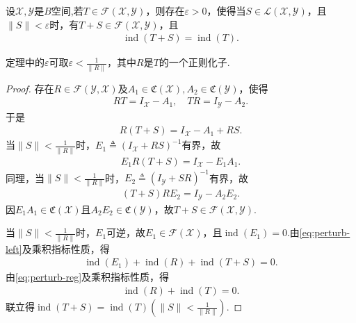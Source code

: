\documentclass[../../main.tex]{subfiles}%
\begin{document}
\begin{theorem}\label{theorem:泛函分析--定理3.6.7}
设$\mathscr{X},\mathscr{Y}$是$B$空间,若$T\in\mathscr{F}(\mathscr{X},\mathscr{Y})$，则存在$\varepsilon>0$，使得当$S\in\mathscr{L}(\mathscr{X},\mathscr{Y})$，且$\|S\|<\varepsilon$时，有$T+S\in\mathscr{F}(\mathscr{X},\mathscr{Y})$，且
\begin{align*}
\operatorname{ind}(T+S)=\operatorname{ind}(T).
\end{align*}
\end{theorem}
\begin{remark}
定理中的$\varepsilon$可取$\varepsilon<\frac{1}{\|R\|}$，其中$R$是$T$的一个正则化子.
\end{remark}
\begin{proof}
存在$R\in\mathscr{F}(\mathscr{Y},\mathscr{X})$及$A_1\in\mathfrak{C}(\mathscr{X}),A_2\in\mathfrak{C}(\mathscr{Y})$，使得
\begin{align}
RT=I_{\mathscr{X}}-A_1,\quad TR=I_{\mathscr{Y}}-A_2.\label{eq:perturb-reg}
\end{align}
于是
\begin{align*}
R(T+S)=I_{\mathscr{X}}-A_1+RS.
\end{align*}
当$\|S\|<\frac{1}{\|R\|}$时，$E_1\triangleq(I_{\mathscr{X}}+RS)^{-1}$有界，故
\begin{align}
E_1R(T+S)=I_{\mathscr{X}}-E_1A_1.\label{eq:perturb-left}
\end{align}
同理，当$\|S\|<\frac{1}{\|R\|}$时，$E_2\triangleq(I_{\mathscr{Y}}+SR)^{-1}$有界，故
\begin{align}
(T+S)RE_2=I_{\mathscr{Y}}-A_2E_2.\label{eq:perturb-right}
\end{align}
因$E_1A_1\in\mathfrak{C}(\mathscr{X})$且$A_2E_2\in\mathfrak{C}(\mathscr{Y})$，故$T+S\in\mathscr{F}(\mathscr{X},\mathscr{Y})$.

当$\|S\|<\frac{1}{\|R\|}$时，$E_1$可逆，故$E_1\in\mathscr{F}(\mathscr{X})$，且$\operatorname{ind}(E_1)=0$.由\eqref{eq:perturb-left}及乘积指标性质，得
\begin{align*}
\operatorname{ind}(E_1)+\operatorname{ind}(R)+\operatorname{ind}(T+S)=0.
\end{align*}
由\eqref{eq:perturb-reg}及乘积指标性质，得
\begin{align*}
\operatorname{ind}(R)+\operatorname{ind}(T)=0.
\end{align*}
联立得$\operatorname{ind}(T+S)=\operatorname{ind}(T)\left(\|S\|<\frac{1}{\|R\|}\right)$.
\end{proof}
\end{document}
